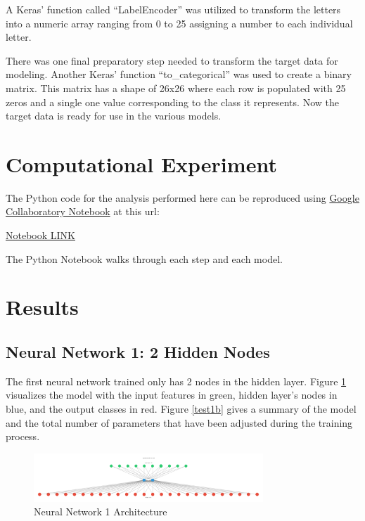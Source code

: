 \documentclass[5p,authoryear]{elsarticle}
\begin{document}
A Keras’ function called “LabelEncoder” was utilized to transform the letters into a numeric array ranging from 0 to 25 assigning a number to each individual letter. 

There was one final preparatory step needed to transform the target data for modeling. 
Another Keras’ function “to\_categorical” was used to create a binary matrix. 
This matrix has a shape of 26x26 where each row is populated with 25 zeros and a single one value corresponding to the class it represents. 
Now the target data is ready for use in the various models.




\section{Computational Experiment}

The Python code for the analysis performed here can be reproduced using \href{https://colab.research.google.com/drive/18ETB63048EzJToFIklG0F_-shNV5fHF7}{Google Collaboratory Notebook} at this url:

\begin{displayquote}
\centering
\href{https://colab.research.google.com/drive/18ETB63048EzJToFIklG0F_-shNV5fHF7}{Notebook LINK}
\end{displayquote}

The Python Notebook walks through each step and each model.  


\section{Results}

\subsection{Neural Network 1: 2 Hidden Nodes}\label{one}

The first neural network trained only has 2 nodes in the hidden layer. 
Figure \ref{test1a} visualizes the model with the input features in green, hidden layer’s nodes in blue, and the output classes in red. 
Figure \ref{test1b} gives a summary of the model and the total number of parameters that have been adjusted during the training process.

\begin{figure}[!htb] \centering
	\includegraphics[width=3.4in]{figures/nn1.pdf}
	\caption[]{Neural Network 1 Architecture} 
	\label{test1a} 
\end{figure}
\end{document}
